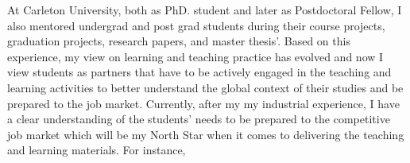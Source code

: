 \documentclass[11pt]{article}
\begin{document}


At Carleton University, both as PhD. student and later as Postdoctoral Fellow, I also mentored undergrad and post grad students during their course projects, graduation projects, research papers, and master thesis'.  Based on this experience, my view on learning and teaching practice has evolved and now I view students as partners that have to be actively engaged in the teaching and learning activities to better understand the global context of their studies and be prepared to the  job market. Currently, after my my industrial experience, I have a clear understanding of the students’ needs to be prepared to the competitive job market which will be my North Star when it comes to delivering the teaching and learning materials.  For instance, 

\end{document}
